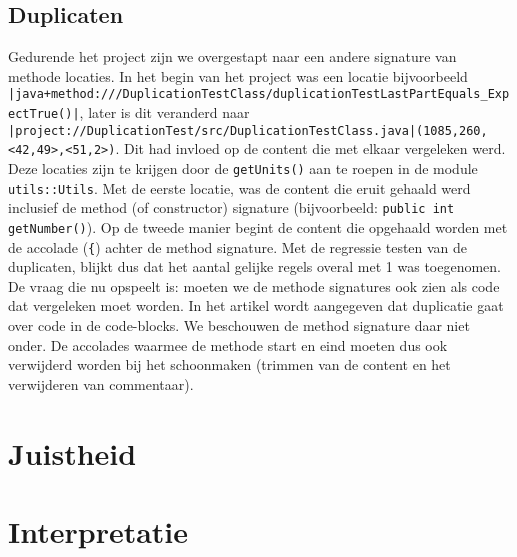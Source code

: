 \documentclass[a4paper]{article}
\begin{document}
\subsection{Duplicaten}
Gedurende het project zijn we overgestapt naar een andere
signature van methode locaties. In het begin van het project was
een locatie bijvoorbeeld
\lstinline{|java+method:///DuplicationTestClass/duplicationTestLastPartEquals_ExpectTrue()|},
later is dit veranderd naar
\texttt{|project://DuplicationTest/src/DuplicationTestClass.java|(1085,260,<42,49>,<51,2>)}.
Dit had invloed op de content die met elkaar vergeleken werd.
Deze locaties zijn te krijgen door de \texttt{getUnits()} aan te
roepen in de module \texttt{utils::Utils}. Met de eerste
locatie, was de content die eruit gehaald werd inclusief de
method (of constructor) signature (bijvoorbeeld: \texttt{public
int getNumber()}). Op de tweede manier begint de content die
opgehaald worden met de accolade (\texttt{\{}) achter de method
signature. Met de regressie testen van de duplicaten, blijkt dus
dat het aantal gelijke regels overal met 1 was toegenomen. De vraag die nu opspeelt is: moeten we de methode signatures ook zien als code dat vergeleken moet worden. In het artikel wordt aangegeven dat duplicatie gaat over code in de code-blocks. We beschouwen de method signature daar niet onder. De accolades waarmee de methode start en eind moeten dus ook verwijderd worden bij het schoonmaken (trimmen van de content en het verwijderen van commentaar).

\section{Juistheid}

\section{Interpretatie}
\end{document}
